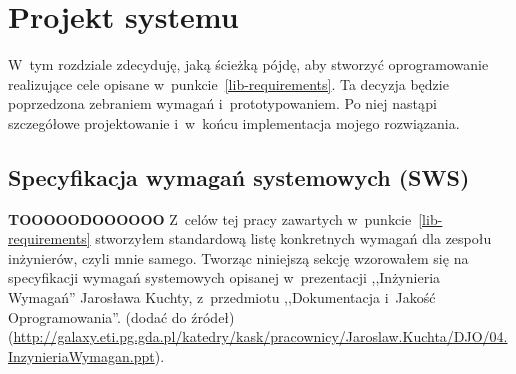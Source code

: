 \chapter{Projekt systemu}
W~tym rozdziale zdecyduję, jaką ścieżką pójdę, aby stworzyć oprogramowanie realizujące cele opisane w~punkcie~\ref{lib-requirements}.
Ta decyzja będzie poprzedzona zebraniem wymagań i~prototypowaniem.
Po niej nastąpi szczegółowe projektowanie i~w~końcu implementacja mojego rozwiązania.



\section{Specyfikacja wymagań systemowych (SWS)}
\textbf{TOOOOODOOOOOO}
Z~celów tej pracy zawartych w~punkcie~\ref{lib-requirements} stworzyłem standardową listę konkretnych wymagań dla zespołu inżynierów, czyli mnie samego.
Tworząc niniejszą sekcję wzorowałem się na specyfikacji wymagań systemowych opisanej w~prezentacji ,,Inżynieria Wymagań'' Jarosława Kuchty, z~przedmiotu ,,Dokumentacja i~Jakość Oprogramowania''. (dodać do źródeł) (\url{http://galaxy.eti.pg.gda.pl/katedry/kask/pracownicy/Jaroslaw.Kuchta/DJO/04.InzynieriaWymagan.ppt}).


